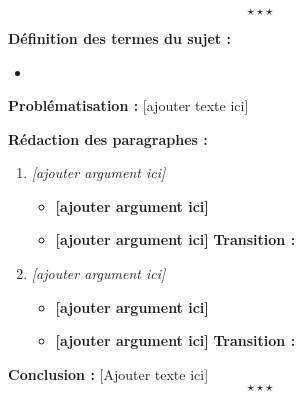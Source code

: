 \newpage \begin{center}
	\subsubsection*{}
\end{center}
$$\star \star \star$$


\noindent \textbf{Définition des termes du sujet :}

\begin{itemize}
	\item 
\end{itemize}

\noindent \textbf{Problématisation :} [ajouter texte ici] \newline

\noindent \textbf{Rédaction des paragraphes :}
\begin{enumerate}[label*=$\longrightarrow$]
	\item \textit{[ajouter argument ici]}
	\begin{itemize}
		\item \textbf{[ajouter argument ici]}
		\item \textbf{[ajouter argument ici]} \newline \textbf{Transition :}
	\end{itemize}
	\item \textit{[ajouter argument ici]}
	\begin{itemize}
		\item \textbf{[ajouter argument ici]}
		\item \textbf{[ajouter argument ici]} \newline \textbf{Transition :}
	\end{itemize}
\end{enumerate}

\textbf{Conclusion :} [Ajouter texte ici] $$\star \star \star$$
